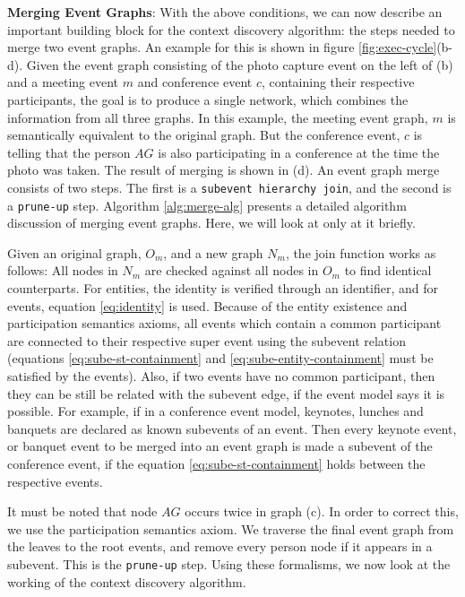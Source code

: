 \textbf{Merging Event Graphs}: With the above conditions, we can now describe an important building block for the context discovery algorithm: the steps needed to merge two event graphs. An example for this is shown in figure \ref{fig:exec-cycle}(b-d). Given the event graph consisting of the photo capture event on the left of (b) and a meeting event $m$ and conference event $c$, containing their respective participants, the goal is to produce a single network, which combines the information from all three graphs. In this example, the meeting event graph, $m$ is semantically equivalent to the original graph. But the conference event, $c$ is telling that the person $AG$ is also participating in a conference at the time the photo was taken. The result of merging is shown in (d). An event graph merge consists of two steps. The first is a \texttt{subevent hierarchy join}, and the second is a \texttt{prune-up} step. Algorithm \ref{alg:merge-alg} presents a detailed algorithm discussion of merging event graphs. Here, we will look at only at it briefly.

Given an original graph, $O_m$, and a new graph $N_m$, the join function works as follows: All nodes in $N_m$ are checked against all nodes in $O_m$ to find identical counterparts. For entities, the identity is verified through an identifier, and for events, equation \eqref{eq:identity} is used. Because of the entity existence and participation semantics axioms, all events which contain a common participant are connected to their respective super event using the subevent relation (equations \eqref{eq:sube-st-containment} and \eqref{eq:sube-entity-containment} must be satisfied by the events). Also, if two events have no common participant, then they can be still be related with the subevent edge, if the event model says it is possible. For example, if in a conference event model, keynotes, lunches and banquets are declared as known subevents of an event. Then every keynote event, or banquet event to be merged into an event graph is made a subevent of the conference event, if the equation \eqref{eq:sube-st-containment} holds between the respective events. 

It must be noted that node $AG$ occurs twice in graph (c). In order to correct this, we use the participation semantics axiom. We traverse the final event graph from the leaves to the root events, and remove every person node if it appears in a subevent. This is the \texttt{prune-up} step. Using these formalisms, we now look at the working of the context discovery algorithm. 

